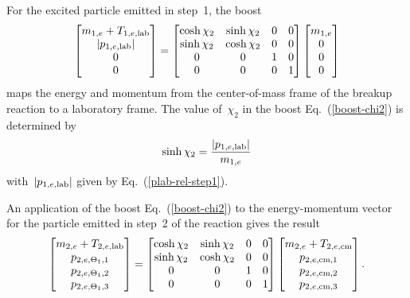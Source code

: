 {For the excited particle emitted in step~1, the boost
\begin{equation}
  \begin{bmatrix}
    m_{1,e} + T_{1,e,\textrm{lab}} \\
    |p_{1,e,\textrm{lab}}|  \\
    0 \\
    0
  \end{bmatrix}
   =
    \begin{bmatrix}
     \cosh \chi_2 & \sinh \chi_2 & 0 & 0 \\
     \sinh \chi_2 & \cosh \chi_2 & 0 & 0 \\
     0  & 0 & 1 & 0 \\
     0  & 0 & 0 & 1
  \end{bmatrix}
  \begin{bmatrix}
    m_{1,e} \\
    0 \\
    0 \\
    0
  \end{bmatrix}
  \label{boost-chi2}
\end{equation}
maps the energy and momentum from the center-of-mass
frame of the breakup reaction to a laboratory frame.
The value of~$\chi_2$ in the boost Eq.~(\ref{boost-chi2}) 
is determined by
$$
  \sinh \chi_2 = \frac{  |p_{1,e,\textrm{lab}}| }{ m_{1,e}}
$$
with~$|p_{1,e,\textrm{lab}}|$ given by Eq.~(\ref{plab-rel-step1}).

An application of the boost Eq.~(\ref{boost-chi2}) to the
energy-momentum vector for the
particle emitted in step~2 of the reaction gives the result
\begin{equation}
  \begin{bmatrix}
    m_{2,e} + T_{2,e,\textrm{lab}} \\
    p_{2,e,{\Theta_1},1} \\
    p_{2,e,{\Theta_1},2} \\
    p_{2,e,{\Theta_1},3}
  \end{bmatrix}
   =
    \begin{bmatrix}
     \cosh \chi_2 & \sinh \chi_2 & 0 & 0 \\
     \sinh \chi_2 & \cosh \chi_2 & 0 & 0 \\
     0  & 0 & 1 & 0 \\
     0  & 0 & 0 & 1
  \end{bmatrix}
  \begin{bmatrix}
    m_{2,e} + T_{2,e,\textrm{cm}} \\
    p_{2,e,\textrm{cm},1} \\
    p_{2,e,\textrm{cm},2} \\
    p_{2,e,\textrm{cm},3}
  \end{bmatrix}.
  \label{R-3-inv-step2}
\end{equation}

}
